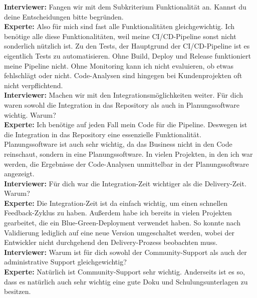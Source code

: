 \begin{center}
\begin{figure}[H]
    \centering
    \label{fig:CEA}
\end{figure}	
\end{center}
\newpage
\resetlinenumber
\begin{linenumbers}
    \textbf{Interviewer:} Fangen wir mit dem Subkriterium Funktionalität an. Kannst du deine Entscheidungen bitte begründen.\\
    \textbf{Experte:} Also für mich sind fast alle Funktionalitäten gleichgewichtig. Ich benötige alle diese Funktionalitäten, weil meine CI/CD-Pipeline sonst nicht sonderlich nützlich ist. Zu den Tests, der Hauptgrund der CI/CD-Pipeline ist es eigentlich Tests zu automatisieren. Ohne Build, Deploy und Release funktioniert meine Pipeline nicht. Ohne Monitoring kann ich nicht evaluieren, ob etwas fehlschlägt oder nicht. Code-Analysen sind hingegen bei Kundenprojekten oft nicht verpflichtend.\\
    \textbf{Interviewer:} Machen wir mit den Integrationsmöglichkeiten weiter. Für dich waren sowohl die Integration in das Repository als auch in Planungssoftware wichtig. Warum?\\
    \textbf{Experte:} Ich benötige auf jeden Fall mein Code für die Pipeline. Deswegen ist die Integration in das Repository eine essenzielle Funktionalität. Planungssoftware ist auch sehr wichtig, da das Business nicht in den Code reinschaut, sondern in eine Planungssoftware. In vielen Projekten, in den ich war werden, die Ergebnisse der Code-Analysen unmittelbar in der Planungssoftware angezeigt.\\
    \textbf{Interviewer:} Für dich war die Integration-Zeit wichtiger als die Delivery-Zeit. Warum?\\
    \textbf{Experte:} Die Integration-Zeit ist da einfach wichtig, um einen schnellen Feedback-Zyklus zu haben. Außerdem habe ich bereits in vielen Projekten gearbeitet, die ein Blue-Green-Deployment verwendet haben. So konnte nach Validierung lediglich auf eine neue Version umgeschaltet werden, wobei der Entwickler nicht durchgehend den Delivery-Prozess beobachten muss.\\ 
    \textbf{Interviewer:} Warum ist für dich sowohl der Community-Support als auch der administrative Support gleichgewichtig?\\
    \textbf{Experte:} Natürlich ist Community-Support sehr wichtig. Anderseits ist es so, dass es natürlich auch sehr wichtig eine gute Doku und Schulungsunterlagen zu besitzen. \\

\end{linenumbers}

